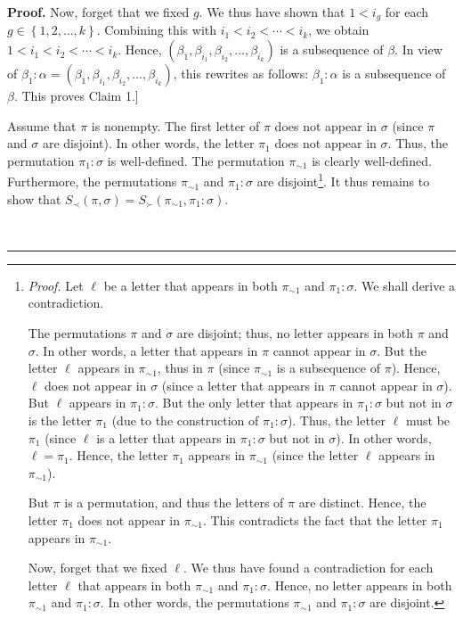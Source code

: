 \documentclass[numbers=enddot,12pt,final,onecolumn,notitlepage]{scrartcl}%
\theoremstyle{definition}
\newenvironment{proof}[1][Proof]{\noindent\textbf{#1.} }{\ \rule{0.5em}{0.5em}}
\begin{document}
\begin{proof}
Now, forget that we fixed $g$. We thus have shown that $1<i_{g}$ for each
$g\in\left\{  1,2,\ldots,k\right\}  $. Combining this with $i_{1}<i_{2}%
<\cdots<i_{k}$, we obtain $1<i_{1}<i_{2}<\cdots<i_{k}$. Hence, $\left(
\beta_{1},\beta_{i_{1}},\beta_{i_{2}},\ldots,\beta_{i_{k}}\right)  $ is a
subsequence of $\beta$. In view of $\beta_{1}:\alpha=\left(  \beta_{1}%
,\beta_{i_{1}},\beta_{i_{2}},\ldots,\beta_{i_{k}}\right)  $, this rewrites as
follows: $\beta_{1}:\alpha$ is a subsequence of $\beta$. This proves Claim 1.]

Assume that $\pi$ is nonempty. The first letter of $\pi$ does not appear in
$\sigma$ (since $\pi$ and $\sigma$ are disjoint). In other words, the letter
$\pi_{1}$ does not appear in $\sigma$. Thus, the permutation $\pi_{1}:\sigma$
is well-defined. The permutation $\pi_{\sim1}$ is clearly well-defined.
Furthermore, the permutations $\pi_{\sim1}$ and $\pi_{1}:\sigma$ are
disjoint\footnote{\textit{Proof.} Let $\ell$ be a letter that appears in both
$\pi_{\sim1}$ and $\pi_{1}:\sigma$. We shall derive a contradiction.
\par
The permutations $\pi$ and $\sigma$ are disjoint; thus, no letter appears in
both $\pi$ and $\sigma$. In other words, a letter that appears in $\pi$ cannot
appear in $\sigma$. But the letter $\ell$ appears in $\pi_{\sim1}$, thus in
$\pi$ (since $\pi_{\sim1}$ is a subsequence of $\pi$). Hence, $\ell$ does not
appear in $\sigma$ (since a letter that appears in $\pi$ cannot appear in
$\sigma$). But $\ell$ appears in $\pi_{1}:\sigma$. But the only letter that
appears in $\pi_{1}:\sigma$ but not in $\sigma$ is the letter $\pi_{1}$ (due
to the construction of $\pi_{1}:\sigma$). Thus, the letter $\ell$ must be
$\pi_{1}$ (since $\ell$ is a letter that appears in $\pi_{1}:\sigma$ but not
in $\sigma$). In other words, $\ell=\pi_{1}$. Hence, the letter $\pi_{1}$
appears in $\pi_{\sim1}$ (since the letter $\ell$ appears in $\pi_{\sim1}$).
\par
But $\pi$ is a permutation, and thus the letters of $\pi$ are distinct. Hence,
the letter $\pi_{1}$ does not appear in $\pi_{\sim1}$. This contradicts the
fact that the letter $\pi_{1}$ appears in $\pi_{\sim1}$.
\par
Now, forget that we fixed $\ell$. We thus have found a contradiction for each
letter $\ell$ that appears in both $\pi_{\sim1}$ and $\pi_{1}:\sigma$. Hence,
no letter appears in both $\pi_{\sim1}$ and $\pi_{1}:\sigma$. In other words,
the permutations $\pi_{\sim1}$ and $\pi_{1}:\sigma$ are disjoint.}. It thus
remains to show that $S_{\prec}\left(  \pi,\sigma\right)  =S_{\succ}\left(
\pi_{\sim1},\pi_{1}:\sigma\right)  $.


\end{proof}
\end{document}
